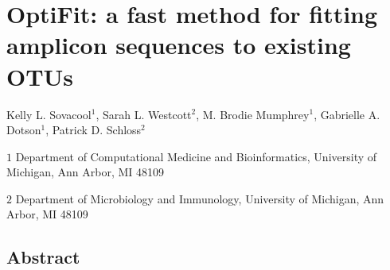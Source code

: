 \documentclass[
  11pt,
]{article}
\author{}
\date{\vspace{-2.5em}}
\begin{document}
\hypertarget{optifit-a-fast-method-for-fitting-amplicon-sequences-to-existing-otus}{%
\section{OptiFit: a fast method for fitting amplicon sequences to
existing
OTUs}\label{optifit-a-fast-method-for-fitting-amplicon-sequences-to-existing-otus}}

Kelly L. Sovacool\({^1}\), Sarah L. Westcott\({^2}\), M. Brodie
Mumphrey\({^1}\), Gabrielle A. Dotson\({^1}\), Patrick D.
Schloss\({^2}\)

\(1\) Department of Computational Medicine and Bioinformatics,
University of Michigan, Ann Arbor, MI 48109

\(2\) Department of Microbiology and Immunology, University of Michigan,
Ann Arbor, MI 48109

\hypertarget{abstract}{%
\subsection{Abstract}\label{abstract}}
\end{document}
